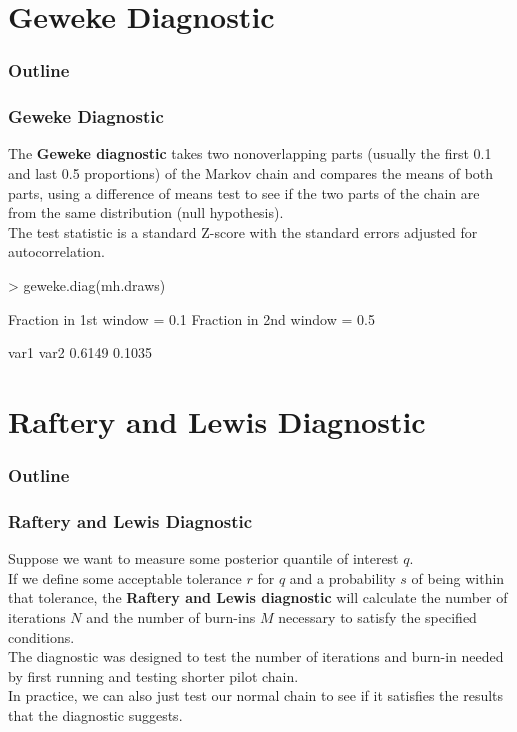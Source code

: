 \documentclass[handout]{beamer}
\begin{document}
\section{Geweke Diagnostic}

\begin{frame}
\frametitle{Outline}
\tableofcontents[currentsection]
\end{frame}

\begin{frame}[fragile]
\frametitle{Geweke Diagnostic}
\pause
The \textbf{Geweke diagnostic} takes two nonoverlapping parts (usually
the first 0.1 and last 0.5 proportions) of the
Markov chain and compares the means of both parts, using a
difference of means test to see if the two parts of the chain are from
the same distribution (null hypothesis). \\
\pause
\bigskip
The test statistic is a standard Z-score with the standard errors
adjusted for autocorrelation. \\
\pause
\bigskip
\tiny
\begin{Schunk}
\begin{Sinput}
> geweke.diag(mh.draws)
\end{Sinput}
\begin{Soutput}
Fraction in 1st window = 0.1
Fraction in 2nd window = 0.5 

  var1   var2 
0.6149 0.1035 
\end{Soutput}
\end{Schunk}
\normalsize 
\end{frame}

\section{Raftery and Lewis Diagnostic}

\begin{frame}
\frametitle{Outline}
\tableofcontents[currentsection]
\end{frame}

\begin{frame}
\frametitle{Raftery and Lewis Diagnostic}
\pause
Suppose we want to measure some posterior quantile of interest $q$.\\
\bigskip
\pause 
If we define some acceptable tolerance $r$ for $q$ and a
probability $s$ of being within that tolerance, the \textbf{Raftery
and Lewis
diagnostic} will calculate the number of iterations $N$ and the number of
burn-ins $M$ necessary to satisfy the specified conditions.\\
\bigskip
\pause
The diagnostic was designed to test the number of iterations and burn-in needed by first running and testing shorter pilot chain. \\
\bigskip
\pause
In practice, we can also just test our normal chain to see if it
satisfies the results that the diagnostic suggests.
\end{frame}
\end{document}

